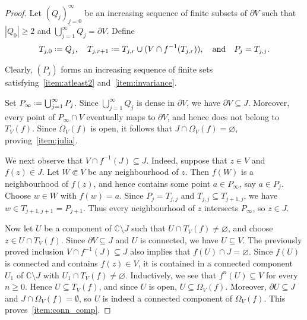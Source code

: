 \documentclass[12pt,a4paper,reqno]{amsart}
\theoremstyle{plain}
\renewcommand{\subset}{\subseteq}
\theoremstyle{definition}
\theoremstyle{remark}
\numberwithin{equation}{section}
\newcommand \C{\mathbb{C}}
\newcommand*{\defeq}{\mathrel{\vcenter{\baselineskip0.5ex \lineskiplimit0pt
                     \hbox{\scriptsize.}\hbox{\scriptsize.}}}%
                     =}
\begin{document}
\begin{proof}
    Let $(Q_j)_{j=0}^{\infty}$ be an increasing sequence of finite subsets of $\partial V$ such that $|Q_0| \geq 2$ and $\overline{\bigcup_{j = 1}^\infty Q_j} = \partial V$.
    Define
    $$
        T_{j, 0} \defeq Q_j, \quad T_{j, r + 1} \defeq T_{j, r} \cup (V \cap f^{-1}(T_{j, r})), \quad \text{and}\quad P_j = T_{j, j}.
    $$

    Clearly, $(P_j)$ forms an increasing sequence of finite sets satisfying~\ref{item:atleast2} and~\ref{item:invariance}. 

    Set $P_\infty \defeq \bigcup_{j=1}^\infty P_j$. Since $\bigcup_{j = 1}^\infty Q_j$ is dense in $\partial V$, we have $\partial V \subset J$. Moreover, every point of $P_\infty \cap V$ eventually maps to
    $\partial V$, and hence does not belong to $T_V(f)$. Since $\Omega_V(f)$ is open, it follows that $J \cap \Omega_V(f) = \varnothing$, proving~\ref{item:julia}.

    We next observe that $V \cap f^{-1}(J) \subset J$. Indeed, suppose that
    $z \in V$ and $f(z) \in J$. Let $W \Subset V$ be any neighbourhood of $z$. Then
    $f(W)$ is a neighbourhood of $f(z)$, and hence contains some point $a \in P_\infty$, 
    say $a \in P_j$. Choose $w \in W$ with $f(w)=a$. Since
    $P_j=T_{j,j}$ and $T_{j,j}\subset T_{j+1,j}$, we have
    $w \in T_{j+1,j+1}=P_{j+1}$. Thus every neighbourhood of $z$ intersects $P_\infty$, so $z\in J$.

    Now let $U$ be a component of $\C\setminus J$ such that $U\cap T_V(f)\neq\varnothing$, and choose
    $z\in U\cap T_V(f)$. Since $\partial V\subset J$ and $U$ is connected, we have $U\subset V$.
    The previously proved inclusion $V \cap f^{-1}(J) \subset J$ also implies that $f(U)\cap J=\varnothing$. Since $f(U)$ is connected
    and contains $f(z)\in V$, 
    it is contained in a connected component $U_1$ 
    of $\C\setminus J$ with $U_1\cap T_V(f)\neq\varnothing$. 
    Inductively, we see that $f^n(U)\subset V$
    for every $n\geq0$. Hence $U\subset T_V(f)$, and since $U$ is open, $U\subset\Omega_V(f)$. Moreover,
    $\partial U\subset J$ and $J\cap \Omega_V(f)=\emptyset$,
    so $U$ is indeed a connected component of $\Omega_V(f)$.
   This proves~\ref{item:conn_comp}.   
\end{proof}
\end{document}
